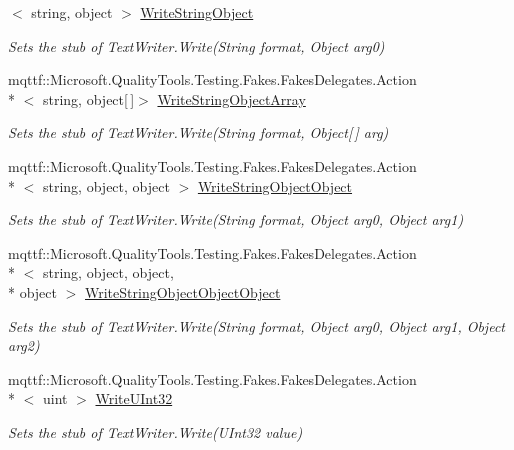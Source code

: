 \begin{DoxyCompactItemize}
$<$ string, object $>$ \hyperlink{class_system_1_1_i_o_1_1_fakes_1_1_stub_stream_writer_a4ecbe411f96d26955ede63333d1f526f}{Write\-String\-Object}
\begin{DoxyCompactList}\small\item\em Sets the stub of Text\-Writer.\-Write(\-String format, Object arg0)\end{DoxyCompactList}\item 
mqttf\-::\-Microsoft.\-Quality\-Tools.\-Testing.\-Fakes.\-Fakes\-Delegates.\-Action\\*
$<$ string, object\mbox{[}$\,$\mbox{]}$>$ \hyperlink{class_system_1_1_i_o_1_1_fakes_1_1_stub_stream_writer_ad922750593efd0f12977dc2139932c4a}{Write\-String\-Object\-Array}
\begin{DoxyCompactList}\small\item\em Sets the stub of Text\-Writer.\-Write(\-String format, Object\mbox{[}$\,$\mbox{]} arg)\end{DoxyCompactList}\item 
mqttf\-::\-Microsoft.\-Quality\-Tools.\-Testing.\-Fakes.\-Fakes\-Delegates.\-Action\\*
$<$ string, object, object $>$ \hyperlink{class_system_1_1_i_o_1_1_fakes_1_1_stub_stream_writer_aa5eae8ad92e34f4a1d25010f370c9b56}{Write\-String\-Object\-Object}
\begin{DoxyCompactList}\small\item\em Sets the stub of Text\-Writer.\-Write(\-String format, Object arg0, Object arg1)\end{DoxyCompactList}\item 
mqttf\-::\-Microsoft.\-Quality\-Tools.\-Testing.\-Fakes.\-Fakes\-Delegates.\-Action\\*
$<$ string, object, object, \\*
object $>$ \hyperlink{class_system_1_1_i_o_1_1_fakes_1_1_stub_stream_writer_a1e194a47418a0f3d83e321dcdd96c2c2}{Write\-String\-Object\-Object\-Object}
\begin{DoxyCompactList}\small\item\em Sets the stub of Text\-Writer.\-Write(\-String format, Object arg0, Object arg1, Object arg2)\end{DoxyCompactList}\item 
mqttf\-::\-Microsoft.\-Quality\-Tools.\-Testing.\-Fakes.\-Fakes\-Delegates.\-Action\\*
$<$ uint $>$ \hyperlink{class_system_1_1_i_o_1_1_fakes_1_1_stub_stream_writer_a0367a489a38d479170440cd913568e6a}{Write\-U\-Int32}
\begin{DoxyCompactList}\small\item\em Sets the stub of Text\-Writer.\-Write(\-U\-Int32 value)\end{DoxyCompactList}\item 

\end{DoxyCompactItemize}
